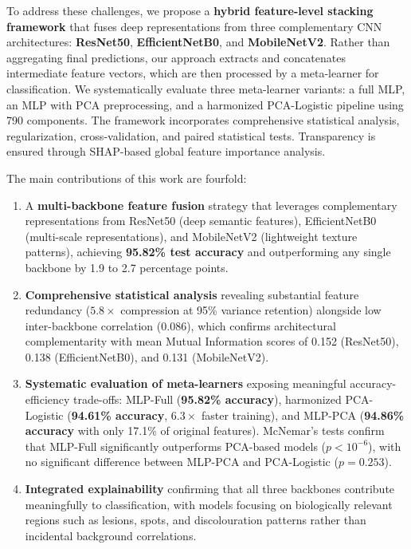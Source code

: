 \documentclass[pdflatex,sn-basic]{sn-jnl}
\begin{document}
To address these challenges, we propose a \textbf{hybrid feature-level stacking framework} that fuses deep representations from three complementary CNN architectures: \textbf{ResNet50}, \textbf{EfficientNetB0}, and \textbf{MobileNetV2}. Rather than aggregating final predictions, our approach extracts and concatenates intermediate feature vectors, which are then processed by a meta-learner for classification. We systematically evaluate three meta-learner variants: a full MLP, an MLP with PCA preprocessing, and a harmonized PCA-Logistic pipeline using 790 components. The framework incorporates comprehensive statistical analysis, regularization, cross-validation, and paired statistical tests. Transparency is ensured through SHAP-based global feature importance analysis.

The main contributions of this work are fourfold:
\begin{enumerate}
    \item A \textbf{multi-backbone feature fusion} strategy that leverages complementary representations from ResNet50 (deep semantic features), EfficientNetB0 (multi-scale representations), and MobileNetV2 (lightweight texture patterns), achieving \textbf{95.82\% test accuracy} and outperforming any single backbone by 1.9 to 2.7 percentage points.

    \item \textbf{Comprehensive statistical analysis} revealing substantial feature redundancy ($5.8\times$ compression at 95\% variance retention) alongside low inter-backbone correlation (0.086), which confirms architectural complementarity with mean Mutual Information scores of 0.152 (ResNet50), 0.138 (EfficientNetB0), and 0.131 (MobileNetV2).

    \item \textbf{Systematic evaluation of meta-learners} exposing meaningful accuracy-efficiency trade-offs: MLP-Full (\textbf{95.82\% accuracy}), harmonized PCA-Logistic (\textbf{94.61\% accuracy}, $6.3\times$ faster training), and MLP-PCA (\textbf{94.86\% accuracy} with only 17.1\% of original features). McNemar's tests confirm that MLP-Full significantly outperforms PCA-based models ($p < 10^{-6}$), with no significant difference between MLP-PCA and PCA-Logistic ($p = 0.253$).

    \item \textbf{Integrated explainability} confirming that all three backbones contribute meaningfully to classification, with models focusing on biologically relevant regions such as lesions, spots, and discolouration patterns rather than incidental background correlations.
\end{enumerate}
\end{document}
